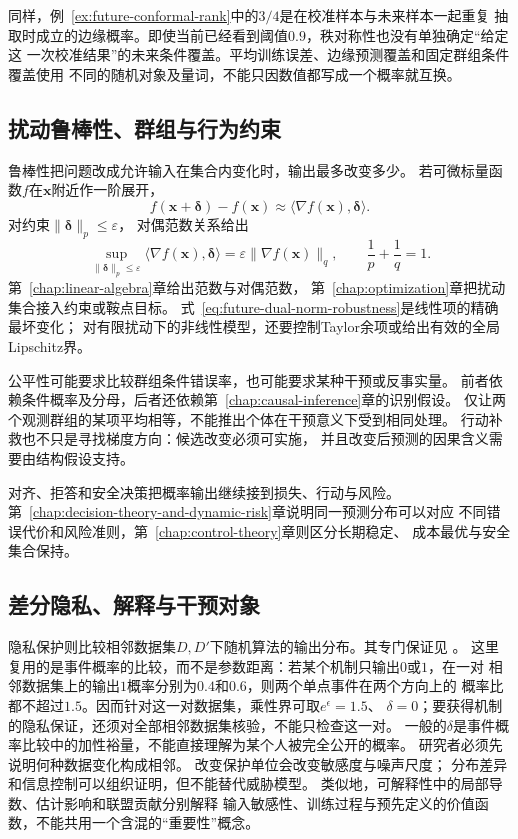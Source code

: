 同样，例~\ref{ex:future-conformal-rank}中的$3/4$是在校准样本与未来样本一起重复
抽取时成立的边缘概率。即使当前已经看到阈值$0.9$，秩对称性也没有单独确定“给定这
一次校准结果”的未来条件覆盖。平均训练误差、边缘预测覆盖和固定群组条件覆盖使用
不同的随机对象及量词，不能只因数值都写成一个概率就互换。


\subsection{扰动鲁棒性、群组与行为约束}
\label{sec:future-perturbations-groups-behavior}

鲁棒性把问题改成允许输入在集合内变化时，输出最多改变多少。
若可微标量函数$f$在$\bm{x}$附近作一阶展开，
\[
  f(\bm{x}+\bm{\delta})-f(\bm{x})
  \approx
  \langle\nabla f(\bm{x}),\bm{\delta}\rangle.
\]
对约束$\lVert\bm{\delta}\rVert_p\leq\varepsilon$，
对偶范数关系给出
\begin{equation}
  \sup_{\lVert\bm{\delta}\rVert_p\leq\varepsilon}
  \langle\nabla f(\bm{x}),\bm{\delta}\rangle
  =
  \varepsilon
  \lVert\nabla f(\bm{x})\rVert_q,
  \qquad
  \frac{1}{p}+\frac{1}{q}=1.
  \label{eq:future-dual-norm-robustness}
\end{equation}
第~\ref{chap:linear-algebra}章给出范数与对偶范数，
第~\ref{chap:optimization}章把扰动集合接入约束或鞍点目标。
式~\eqref{eq:future-dual-norm-robustness}是线性项的精确最坏变化；
对有限扰动下的非线性模型，还要控制Taylor余项或给出有效的全局Lipschitz界。

公平性可能要求比较群组条件错误率，也可能要求某种干预或反事实量。
前者依赖条件概率及分母，后者还依赖第~\ref{chap:causal-inference}章的识别假设。
仅让两个观测群组的某项平均相等，不能推出个体在干预意义下受到相同处理。
行动补救也不只是寻找梯度方向：候选改变必须可实施，
并且改变后预测的因果含义需要由结构假设支持。

对齐、拒答和安全决策把概率输出继续接到损失、行动与风险。
第~\ref{chap:decision-theory-and-dynamic-risk}章说明同一预测分布可以对应
不同错误代价和风险准则，第~\ref{chap:control-theory}章则区分长期稳定、
成本最优与安全集合保持。

\subsection{差分隐私、解释与干预对象}
\label{sec:future-data-changes-privacy-explanation}

隐私保护则比较相邻数据集$D,D'$下随机算法的输出分布。其专门保证见
。
这里复用的是事件概率的比较，而不是参数距离：若某个机制只输出$0$或$1$，在一对
相邻数据集上的输出$1$概率分别为$0.4$和$0.6$，则两个单点事件在两个方向上的
概率比都不超过$1.5$。因而针对这一对数据集，乘性界可取$e^\epsilon=1.5$、
$\delta=0$；要获得机制的隐私保证，还须对全部相邻数据集核验，不能只检查这一对。
一般的$\delta$是事件概率比较中的加性裕量，不能直接理解为某个人被完全公开的概率。
研究者必须先说明何种数据变化构成相邻。
改变保护单位会改变敏感度与噪声尺度；
分布差异和信息控制可以组织证明，但不能替代威胁模型。
类似地，可解释性中的局部导数、估计影响和联盟贡献分别解释
输入敏感性、训练过程与预先定义的价值函数，不能共用一个含混的“重要性”概念。

